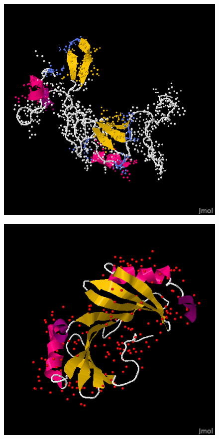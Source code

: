 \documentclass{article}
\begin{document}
\begin{figure}
\centering
\begin{minipage}{.5\textwidth}
  \centering
  \includegraphics[width=.9\linewidth]{target_group_v2}
  \label{fig:test1}
\end{minipage}%
\begin{minipage}{.5\textwidth}
  \centering
  \includegraphics[width=.9\linewidth]{target_native}
  \label{fig:test2}
\end{minipage}
\end{figure}
\end{document}
